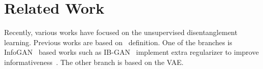 \section{Related Work}

Recently, various works have focused on the unsupervised disentanglement learning. 
Previous works are based on~\cite{disen_definitiaon_1} definition.
One of the branches %
is InfoGAN~\cite{info-gan} based works such as IB-GAN~\cite{ib-gan} implement extra regularizer to improve informativeness~\cite{dci}.
The other branch is based on the VAE.
